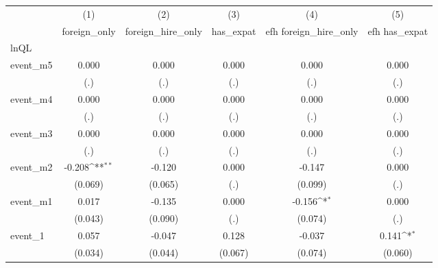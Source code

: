 {
\def\sym#1{\ifmmode^{#1}\else\(^{#1}\)\fi}
\begin{tabular}{l*{5}{c}}
\hline\hline
            &\multicolumn{1}{c}{(1)}&\multicolumn{1}{c}{(2)}&\multicolumn{1}{c}{(3)}&\multicolumn{1}{c}{(4)}&\multicolumn{1}{c}{(5)}\\
            &\multicolumn{1}{c}{foreign\_only}&\multicolumn{1}{c}{foreign\_hire\_only}&\multicolumn{1}{c}{has\_expat}&\multicolumn{1}{c}{efh foreign\_hire\_only}&\multicolumn{1}{c}{efh has\_expat}\\
\hline
lnQL        &                     &                     &                     &                     &                     \\
event\_m5    &       0.000         &       0.000         &       0.000         &       0.000         &       0.000         \\
            &         (.)         &         (.)         &         (.)         &         (.)         &         (.)         \\
[1em]
event\_m4    &       0.000         &       0.000         &       0.000         &       0.000         &       0.000         \\
            &         (.)         &         (.)         &         (.)         &         (.)         &         (.)         \\
[1em]
event\_m3    &       0.000         &       0.000         &       0.000         &       0.000         &       0.000         \\
            &         (.)         &         (.)         &         (.)         &         (.)         &         (.)         \\
[1em]
event\_m2    &      -0.208\sym{**} &      -0.120         &       0.000         &      -0.147         &       0.000         \\
            &     (0.069)         &     (0.065)         &         (.)         &     (0.099)         &         (.)         \\
[1em]
event\_m1    &       0.017         &      -0.135         &       0.000         &      -0.156\sym{*}  &       0.000         \\
            &     (0.043)         &     (0.090)         &         (.)         &     (0.074)         &         (.)         \\
[1em]
event\_1     &       0.057         &      -0.047         &       0.128         &      -0.037         &       0.141\sym{*}  \\
            &     (0.034)         &     (0.044)         &     (0.067)         &     (0.074)         &     (0.060)         \\

\end{tabular}}
